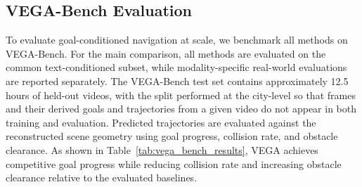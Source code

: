 \begin{table}[!t]
\centering
\footnotesize
\setlength{\tabcolsep}{3pt}
\renewcommand{\arraystretch}{1.1}
\caption{Benchmark sensitivity to pointcloud source.
For goal progress ($G$) and clearance ($Cl$), each monocular-model entry reports mean $\mu$/Spearman $\rho$ relative to MoGe-2.
Collision ($C$) reports mean collision percentage.
$G$: goal progress ($\uparrow$);
$C$: collision percentage ($\downarrow$);
$Cl$: clearance in meters ($\uparrow$).}
\label{tab:geometry_sensitivity}
\vspace{-4ex}
\end{table}

\subsection{VEGA-Bench Evaluation}

To evaluate goal-conditioned navigation at scale, we benchmark all methods on VEGA-Bench.
For the main comparison, all methods are evaluated on the common text-conditioned subset, while modality-specific real-world evaluations are reported separately.
The VEGA-Bench test set contains approximately 12.5 hours of held-out videos, with the split performed at the city-level so that frames and their derived goals and trajectories from a given video do not appear in both training and evaluation.
Predicted trajectories are evaluated against the reconstructed scene geometry using goal progress, collision rate, and obstacle clearance.
As shown in Table~\ref{tab:vega_bench_results}, VEGA achieves competitive goal progress while reducing collision rate and increasing obstacle clearance relative to the evaluated baselines.